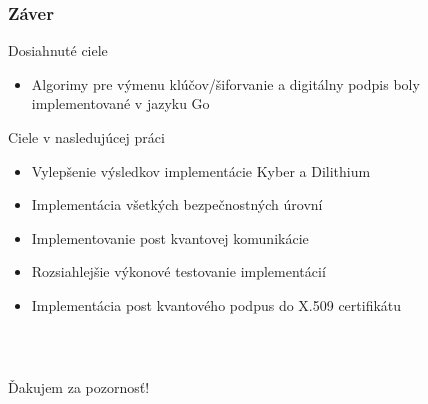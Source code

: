 \documentclass[%
  14pt,       				%
	t,                  %
	aspectratio=1610,   %
	unicode,						%
]{beamer}				    	%
\begin{document}
\begin{frame} 
	\frametitle{Záver}
	Dosiahnuté ciele
	\begin{itemize}
		\item Algorimy pre výmenu klúčov/šiforvanie a digitálny podpis boly implementované v jazyku Go
	\end{itemize}
	Ciele v nasledujúcej práci
	\begin{itemize}
		\item Vylepšenie výsledkov implementácie Kyber a Dilithium
		\item Implementácia všetkých bezpečnostných úrovní
		\item Implementovanie post kvantovej komunikácie
		\item Rozsiahlejšie výkonové testovanie implementácií
		\item Implementácia post kvantového podpus do X.509 certifikátu
	\end{itemize}
\end{frame}

\begin{frame}[c]
	\frametitle{\mbox{ }}
	\begin{center}
		{\Huge Ďakujem za pozornosť!}
	\end{center}
\end{frame}

\end{document}
